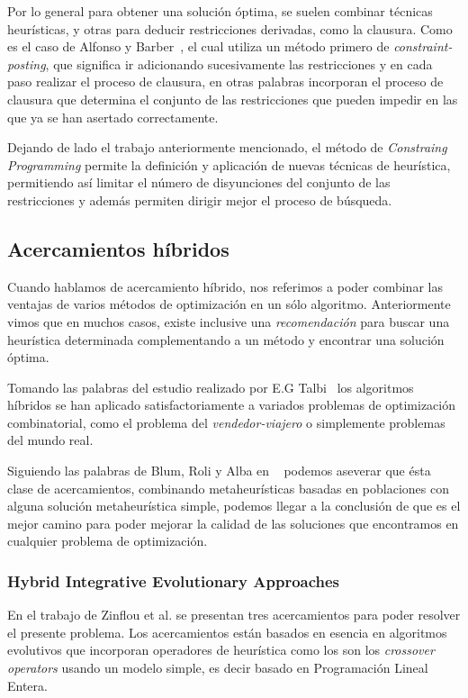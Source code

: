 %
Por lo general para obtener una solución óptima, se suelen combinar técnicas heurísticas,
y otras para deducir restricciones derivadas, como la clausura.
Como es el caso de Alfonso y Barber~\cite{esp1}, el cual utiliza un método primero de \emph{constraint-posting},
que significa ir adicionando sucesivamente las restricciones y en cada paso realizar el proceso de clausura,
en otras palabras incorporan el proceso de clausura que determina el conjunto de las restricciones que pueden
impedir  en las que ya se han asertado correctamente.

Dejando de lado el trabajo anteriormente mencionado, el método de \emph{Constraing Programming} permite la definición
y aplicación de nuevas técnicas de heurística, permitiendo así limitar el número de disyunciones
del conjunto de las restricciones y además permiten dirigir mejor el proceso de búsqueda.

\subsection{Acercamientos híbridos}

Cuando hablamos de acercamiento híbrido, nos referimos a poder combinar las ventajas de varios
métodos de optimización en un sólo algoritmo.
Anteriormente vimos que en muchos casos, existe inclusive una \emph{recomendación} para buscar
una heurística determinada complementando a un método y encontrar una solución óptima.


Tomando las palabras del estudio realizado por E.G Talbi~\cite{talbi} los algoritmos híbridos
se han aplicado satisfactoriamente a variados problemas de optimización combinatorial, como el problema
del \emph{vendedor-viajero} o simplemente problemas del mundo real.


Siguiendo las palabras de Blum, Roli y Alba en ~\cite{blum} podemos aseverar que ésta clase de acercamientos,
combinando metaheurísticas basadas en  poblaciones con alguna solución metaheurística simple, podemos llegar
a la conclusión de que es el mejor camino para poder mejorar la calidad de las soluciones que encontramos
en cualquier problema de optimización.

\subsubsection{Hybrid Integrative Evolutionary Approaches}
En el trabajo de Zinflou et al. \cite{HYB1} se presentan tres acercamientos para poder
resolver el presente problema. Los acercamientos están basados en esencia en algoritmos evolutivos
que incorporan operadores de heurística como los son los \emph{crossover operators} usando
un modelo simple, es decir basado en  Programación Lineal Entera.

